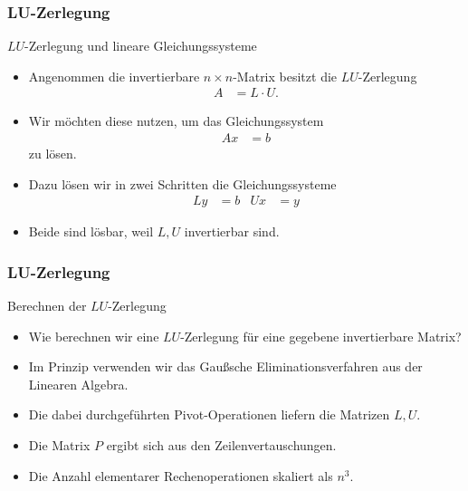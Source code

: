 \documentclass{beamer}
\renewcommand{\oe}{\"o}
\newcommand{\ue}{\"u}
\newcommand{\mytitle}{LU-Zerlegung}
\begin{document}
\begin{frame}\frametitle{\mytitle}
	\begin{block}{$LU$-Zerlegung und lineare Gleichungssysteme}
		\begin{itemize}
			\item Angenommen die invertierbare $n\times n$-Matrix besitzt die $LU$-Zerlegung
				\begin{align*}
					A&=L\cdot U.
				\end{align*}
			\item Wir m\oe chten diese nutzen, um das Gleichungssystem
				\begin{align*}
					Ax&=b
				\end{align*}
				zu l\oe sen.
			\item Dazu l\oe sen wir in zwei Schritten die Gleichungssysteme
				\begin{align*}
					Ly&=b&Ux&=y
				\end{align*}
			\item Beide sind l\oe sbar, weil $L,U$ invertierbar sind.
		\end{itemize}
	\end{block}
\end{frame}

\begin{frame}\frametitle{\mytitle}
	\begin{block}{Berechnen der $LU$-Zerlegung}
		\begin{itemize}
			\item Wie berechnen wir eine $LU$-Zerlegung f\ue r eine gegebene invertierbare Matrix?
			\item Im Prinzip verwenden wir das Gau\ss sche Eliminationsverfahren aus der Linearen Algebra.
			\item Die dabei durchgef\ue hrten Pivot-Operationen liefern die Matrizen $L,U$.
			\item Die Matrix $P$ ergibt sich aus den Zeilenvertauschungen.
			\item Die Anzahl elementarer Rechenoperationen skaliert als $n^3$.
		\end{itemize}
	\end{block}
\end{frame}
\end{document}
